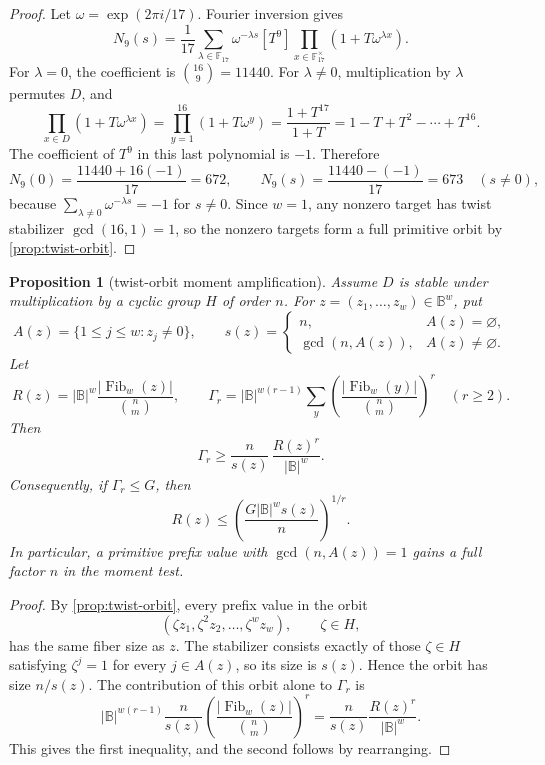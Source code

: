 \documentclass[a4paper,11pt]{amsart}
\newtheorem{proposition}[proposition]{Proposition}
\theoremstyle{remark}
\newcommand{\F}{\mathbb F}
\newcommand{\B}{\mathbb B}
\newcommand{\Fib}{\operatorname{Fib}}
\begin{document}
\begin{proof}
Let \(\omega=\exp(2\pi i/17)\).  Fourier inversion gives
\[
        N_9(s)=\frac{1}{17}\sum_{\lambda\in\F_{17}}\omega^{-\lambda s}
        [T^9]\prod_{x\in\F_{17}^{\times}}(1+T\omega^{\lambda x}).
\]
For \(\lambda=0\), the coefficient is \(\binom{16}{9}=11440\).  For \(\lambda\ne0\), multiplication by \(\lambda\) permutes \(D\), and
\[
        \prod_{x\in D}(1+T\omega^{\lambda x})
        =
        \prod_{y=1}^{16}(1+T\omega^y)
        =\frac{1+T^{17}}{1+T}
        =1-T+T^2-\cdots+T^{16}.
\]
The coefficient of \(T^9\) in this last polynomial is \(-1\).  Therefore
\[
        N_9(0)=\frac{11440+16(-1)}{17}=672,
        \qquad
        N_9(s)=\frac{11440-(-1)}{17}=673
        \quad(s\ne0),
\]
because \(\sum_{\lambda\ne0}\omega^{-\lambda s}=-1\) for \(s\ne0\).  Since \(w=1\), any nonzero target has twist stabilizer \(\gcd(16,1)=1\), so the nonzero targets form a full primitive orbit by \cref{prop:twist-orbit}.
\end{proof}

\begin{proposition}[twist-orbit moment amplification]\label{prop:q-orbit-moment}
Assume \(D\) is stable under multiplication by a cyclic group \(H\) of order \(n\).  For \(z=(z_1,\ldots,z_w)\in\B^w\), put
\[
        A(z)=\{1\le j\le w:z_j\ne0\},
        \qquad
        s(z)=
        \begin{cases}
        n, & A(z)=\varnothing,\\
        \gcd(n,A(z)), & A(z)\ne\varnothing .
        \end{cases}
\]
Let
\[
        R(z)=|\B|^w \frac{|\Fib_w(z)|}{\binom nm},
        \qquad
        \Gamma_r=|\B|^{w(r-1)}
        \sum_y\left(\frac{|\Fib_w(y)|}{\binom nm}\right)^r
        \quad(r\ge2).
\]
Then
\[
        \Gamma_r\ge \frac{n}{s(z)}\,\frac{R(z)^r}{|\B|^w}.
\]
Consequently, if \(\Gamma_r\le G\), then
\[
        R(z)\le\left(\frac{G|\B|^w s(z)}{n}\right)^{1/r}.
\]
In particular, a primitive prefix value with \(\gcd(n,A(z))=1\) gains a full factor \(n\) in the moment test.
\end{proposition}

\begin{proof}
By \cref{prop:twist-orbit}, every prefix value in the orbit
\[
        (\zeta z_1,\zeta^2z_2,\ldots,\zeta^wz_w),
        \qquad \zeta\in H,
\]
has the same fiber size as \(z\).  The stabilizer consists exactly of those \(\zeta\in H\) satisfying \(\zeta^j=1\) for every \(j\in A(z)\), so its size is \(s(z)\).  Hence the orbit has size \(n/s(z)\).  The contribution of this orbit alone to \(\Gamma_r\) is
\[
        |\B|^{w(r-1)}\frac{n}{s(z)}
        \left(\frac{|\Fib_w(z)|}{\binom nm}\right)^r
        =
        \frac{n}{s(z)}\frac{R(z)^r}{|\B|^w}.
\]
This gives the first inequality, and the second follows by rearranging.
\end{proof}
\end{document}
